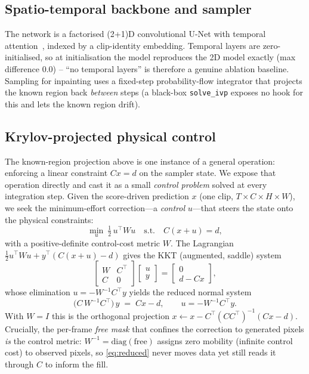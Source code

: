 \subsection{Spatio-temporal backbone and sampler}
The network is a factorised (2+1)D convolutional U-Net with temporal
attention~\cite{tran-2018-r2plus1d,ronneberger-2015,vaswani-2017}, indexed by a
clip-identity embedding. Temporal layers are zero-initialised, so at
initialisation the model reproduces the 2D model exactly (max difference
$0.0$) -- ``no temporal layers'' is therefore a genuine ablation baseline.
Sampling for inpainting uses a fixed-step probability-flow integrator that
projects the known region back \emph{between} steps (a black-box \texttt{solve\_ivp}
exposes no hook for this and lets the known region drift).

\subsection{Krylov-projected physical control}
\label{sec:control}
The known-region projection above is one instance of a general operation:
enforcing a linear constraint $Cx=d$ on the sampler state. We expose that
operation directly and cast it as a small \emph{control problem} solved at every
integration step. Given the score-driven prediction $x$ (one clip,
$T\times C\times H\times W$), we seek the minimum-effort correction---a
\emph{control} $u$---that steers the state onto the physical constraints:
\begin{equation}
  \min_{u}\ \tfrac12\,u^{\!\top} W u
  \quad\text{s.t.}\quad C(x+u)=d,
  \label{eq:control-hard}
\end{equation}
with a positive-definite control-cost metric $W$. The Lagrangian
$\tfrac12 u^{\!\top}Wu + y^{\!\top}(C(x+u)-d)$ gives the KKT (augmented, saddle)
system
\begin{equation}
  \begin{bmatrix} W & C^{\!\top}\\ C & 0 \end{bmatrix}
  \begin{bmatrix} u \\ y \end{bmatrix}
  =
  \begin{bmatrix} 0 \\ d-Cx \end{bmatrix},
  \label{eq:kkt}
\end{equation}
whose elimination $u=-W^{-1}C^{\!\top}y$ yields the reduced normal system
\begin{equation}
  \big(C\,W^{-1}C^{\!\top}\big)\,y \;=\; Cx-d,
  \qquad u=-W^{-1}C^{\!\top}y.
  \label{eq:reduced}
\end{equation}
With $W=I$ this is the orthogonal projection
$x\leftarrow x-C^{\!\top}(CC^{\!\top})^{-1}(Cx-d)$. Crucially, the per-frame
\emph{free mask} that confines the correction to generated pixels \emph{is} the
control metric: $W^{-1}=\mathrm{diag}(\text{free})$ assigns zero mobility
(infinite control cost) to observed pixels, so \eqref{eq:reduced} never moves
data yet still reads it through $C$ to inform the fill.

